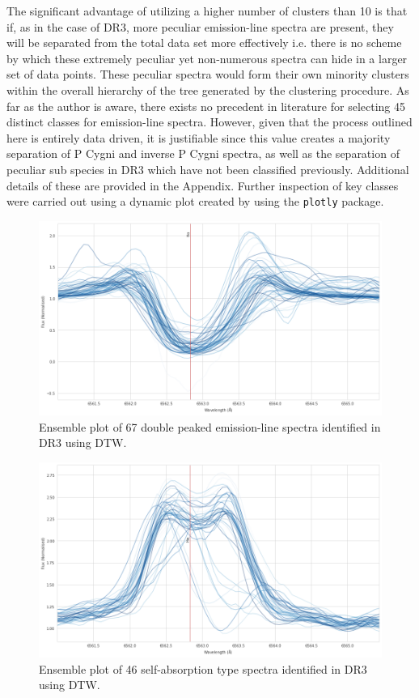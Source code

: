 The significant advantage of utilizing a higher number of clusters than 10 is that if, as in the case of DR3, more peculiar emission-line spectra are present, they will be separated from the total data set more effectively i.e. there is no scheme by which these extremely peculiar yet non-numerous spectra can hide in a larger set of data points. These peculiar spectra would form their own minority clusters within the overall hierarchy of the tree generated by the clustering procedure. As far as the author is aware, there exists no precedent in literature for selecting 45 distinct classes for emission-line spectra. However, given that the process outlined here is entirely data driven, it is justifiable since this value creates a majority separation of P Cygni and inverse P Cygni spectra, as well as the separation of peculiar sub species in DR3 which have not been classified previously. Additional details of these are provided in the Appendix. Further inspection of key classes were carried out using a dynamic plot created by using the \texttt{plotly} package.

\begin{figure}[!htb]
\centering
\includegraphics[scale=0.45]{figures/double peak 1.png}
\caption{Ensemble plot of 67 double peaked emission-line spectra identified in DR3 using DTW.}
\end{figure}

\begin{figure}[!htb]
\centering
\includegraphics[scale=0.45]{figures/emission on abs.png}
\caption{Ensemble plot of 46 self-absorption type spectra identified in DR3 using DTW.}
\end{figure}

